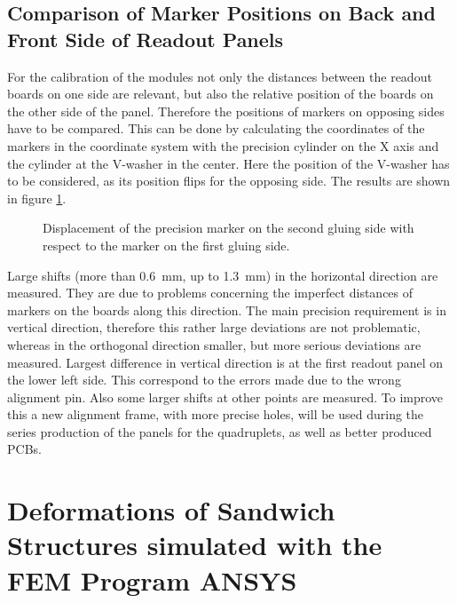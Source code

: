 \documentclass[
a4paper,                                %
twoside,                                %
BCOR1.4cm,                      %
10pt,                           %
headings=normal,                %
headsepline,                    %
clearplainpage, %
final,                                  %
div=14,
parskip=full,
openright,
bibliography=toc
]{scrreprt}
\begin{document}
\section{Comparison of Marker Positions on Back and Front Side of Readout Panels}

For the calibration of the modules not only the distances between the readout boards on one side are relevant, but also the relative position of the boards on the other side of the panel. Therefore the positions of markers on opposing sides have to be compared. This can be done by calculating the coordinates of the markers in the coordinate system with the precision cylinder on the X axis and the cylinder at the V-washer in the center. Here the position of the V-washer has to be considered, as its position flips for the opposing side. The results are shown in figure \ref{sideComp}. 

\begin{figure}[H]	
	\centering
	\qquad
	\caption{Displacement of the precision marker on the second gluing side with respect to the marker on the first gluing side.}
	\label{sideComp}
\end{figure}

Large shifts (more than \SI{0.6}{\mm}, up to \SI{1.3}{\mm}) in the horizontal direction are measured. They are due to problems concerning the imperfect distances of markers on the boards along this direction. The main precision requirement is in vertical direction, therefore this rather large deviations are not problematic, whereas in the orthogonal direction smaller, but more serious deviations are measured. Largest difference in vertical direction is at the first readout panel on the lower left side. This correspond to the errors made due to the wrong alignment pin. Also some larger shifts at other points are measured. To improve this a new alignment frame, with more precise holes, will be used during the series production of the panels for the quadruplets, as well as better produced PCBs. 

\chapter{Deformations of Sandwich Structures simulated with the FEM Program ANSYS}
\end{document}
